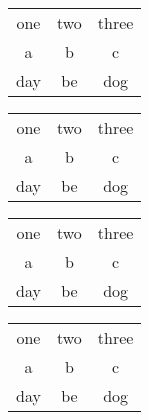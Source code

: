 \begin{table}[h!tb]
\begin{minipage}{1.5 in}
\begin{tabular}{ccc}
one & two & three \\
a  & b  & c \\
day & be & dog
\end{tabular}
\end{minipage}
\begin{minipage}{1.5 in}
\begin{tabular}{ccc}
one & two & three \\
a  & b  & c \\
day & be & dog
\end{tabular}
\end{minipage}
\begin{minipage}{1.5 in}
\begin{tabular}{ccc}
one & two & three \\
a  & b  & c \\
day & be & dog
\end{tabular}
\end{minipage}
\begin{minipage}{1.5 in}
\end{minipage}
\begin{minipage}{1.5 in}
\begin{tabular}{ccc}
one & two & three \\
a  & b  & c \\
day & be & dog
\end{tabular}
\end{minipage}
\end{table}

